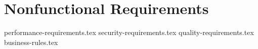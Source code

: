\chapter{Nonfunctional Requirements} \label{chap:nonfunctionalrequirements}

{performance-requirements.tex}
{security-requirements.tex}
{quality-requirements.tex}
{business-rules.tex}
